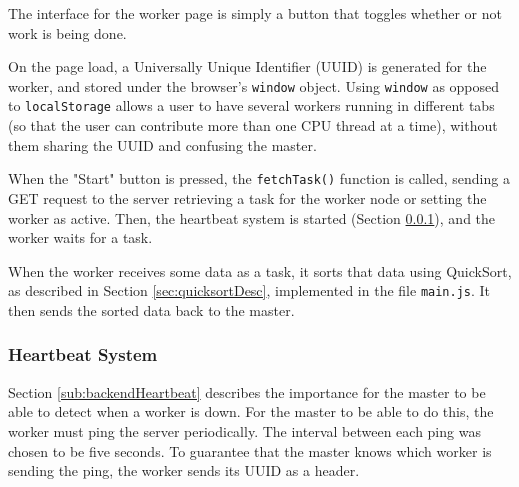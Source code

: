 The interface for the worker page is simply a button that toggles whether or not work is being done. 

On the page load, a Universally Unique Identifier (UUID) is generated for the worker, and stored under the browser's \lstinline{window} object. Using \lstinline{window} as opposed to \lstinline{localStorage} allows a user to have several workers running in different tabs (so that the user can contribute more than one CPU thread at a time), without them sharing the UUID and confusing the master. 

When the "Start" button is pressed, the \lstinline{fetchTask()} function is called, sending a GET request to the server retrieving a task for the worker node or setting the worker as active. Then, the heartbeat system is started (Section \ref{sub:frontendHeartbeat}), and the worker waits for a task.

When the worker receives some data as a task, it sorts that data using QuickSort, as described in Section \ref{sec:quicksortDesc}, implemented in the file \lstinline{main.js}. It then sends the sorted data back to the master.

\subsubsection{Heartbeat System} \label{sub:frontendHeartbeat}
Section \ref{sub:backendHeartbeat} describes the importance for the master to be able to detect when a worker is down. For the master to be able to do this, the worker must ping the server periodically. The interval between each ping was chosen to be five seconds. To guarantee that the master knows which worker is sending the ping, the worker sends its UUID as a header.